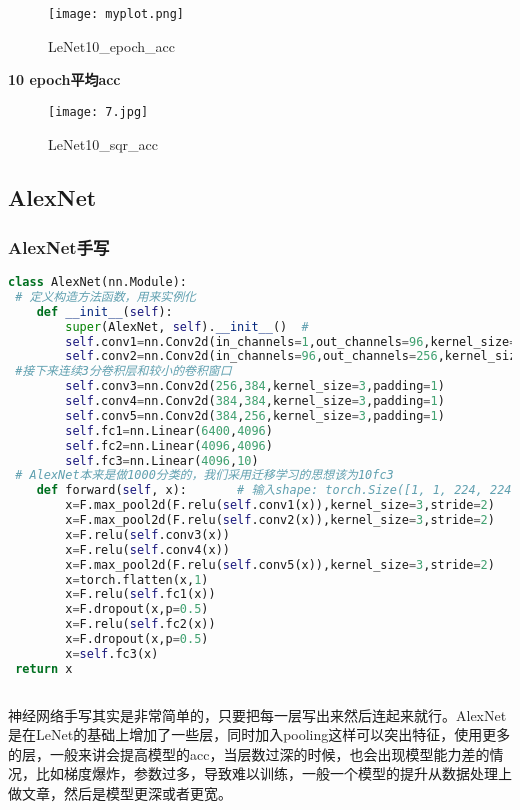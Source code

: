 \begin{figure}[!h]
	\centering
	\texttt{[image: myplot.png]}
	\caption{LeNet10\_epoch\_acc}
	\label{fig:circuitm1}
\end{figure} \par
 \noindent \textbf{10 epoch平均acc}\par
\begin{figure}[!h]
	\centering
	\texttt{[image: 7.jpg]}
	\caption{LeNet10\_sqr\_acc}
	\label{fig:circuitm1}
\end{figure} \par
\subsection{AlexNet}
\subsubsection{AlexNet手写}
 \begin{lstlisting}[language=python]
 class AlexNet(nn.Module):
 # 定义构造方法函数，用来实例化
 	def __init__(self):
 		super(AlexNet, self).__init__()  #  
 		self.conv1=nn.Conv2d(in_channels=1,out_channels=96,kernel_size=11,stride=4,padding=1)
 		self.conv2=nn.Conv2d(in_channels=96,out_channels=256,kernel_size=5,padding=2)
 #接下来连续3分卷积层和较小的卷积窗口
 		self.conv3=nn.Conv2d(256,384,kernel_size=3,padding=1)
 		self.conv4=nn.Conv2d(384,384,kernel_size=3,padding=1)
 		self.conv5=nn.Conv2d(384,256,kernel_size=3,padding=1)
 		self.fc1=nn.Linear(6400,4096)
 		self.fc2=nn.Linear(4096,4096)
 		self.fc3=nn.Linear(4096,10)
 # AlexNet本来是做1000分类的，我们采用迁移学习的思想该为10fc3
 	def forward(self, x):       # 输入shape: torch.Size([1, 1, 224, 224])
 		x=F.max_pool2d(F.relu(self.conv1(x)),kernel_size=3,stride=2)
 		x=F.max_pool2d(F.relu(self.conv2(x)),kernel_size=3,stride=2)
 		x=F.relu(self.conv3(x))
 		x=F.relu(self.conv4(x))
 		x=F.max_pool2d(F.relu(self.conv5(x)),kernel_size=3,stride=2)
 		x=torch.flatten(x,1)
 		x=F.relu(self.fc1(x))
 		x=F.dropout(x,p=0.5)
 		x=F.relu(self.fc2(x))
 		x=F.dropout(x,p=0.5)
 		x=self.fc3(x)
 return x
	
\end{lstlisting}
神经网络手写其实是非常简单的，只要把每一层写出来然后连起来就行。AlexNet是在LeNet的基础上增加了一些层，同时加入pooling这样可以突出特征，使用更多的层，一般来讲会提高模型的acc，当层数过深的时候，也会出现模型能力差的情况，比如梯度爆炸，参数过多，导致难以训练，一般一个模型的提升从数据处理上做文章，然后是模型更深或者更宽。
